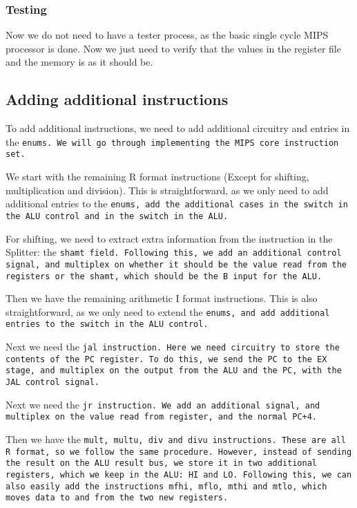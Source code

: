 \subsubsection*{Testing}
Now we do not need to have a tester process, as the basic single cycle MIPS
processor is done. Now we just need to verify that the values in the register
file and the memory is as it should be.

\subsection{Adding additional instructions}
To add additional instructions, we need to add additional circuitry and entries
in the \tt{enum}s. We will go through implementing the MIPS core instruction
set.

We start with the remaining R format instructions (Except for shifting,
multiplication and division). This is straightforward, as we only need to add
additional entries to the \tt{enum}s, add the additional cases in the
\tt{switch} in the ALU control and in the \tt{switch} in the ALU.

For shifting, we need to extract extra information from the instruction in the
Splitter: the \tt{shamt} field. Following this, we add an additional control
signal, and multiplex on whether it should be the value read from the registers
or the \tt{shamt}, which should be the B input for the ALU.

Then we have the remaining arithmetic I format instructions. This is also
straightforward, as we only need to extend the \tt{enum}s, and add additional
entries to the \tt{switch} in the ALU control.

Next we need the \tt{jal} instruction. Here we need circuitry to store the
contents of the \tt{PC} register. To do this, we send the \tt{PC} to the
\tt{EX} stage, and multiplex on the output from the ALU and the \tt{PC}, with
the \tt{JAL} control signal.

Next we need the \tt{jr} instruction. We add an additional signal, and
multiplex on the value read from register, and the normal \tt{PC+4}.

Then we have the \tt{mult}, \tt{multu}, \tt{div} and \tt{divu} instructions.
These are all R format, so we follow the same procedure. However, instead of
sending the result on the ALU result bus, we store it in two additional
registers, which we keep in the ALU: \tt{HI} and \tt{LO}. Following this, we
can also easily add the instructions \tt{mfhi}, \tt{mflo}, \tt{mthi} and
\tt{mtlo}, which moves data to and from the two new registers.

